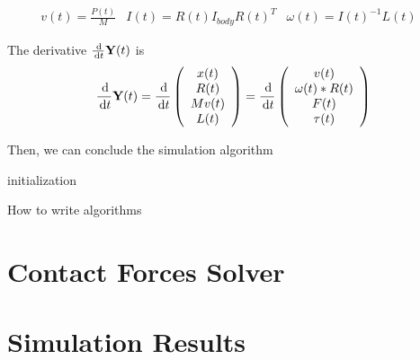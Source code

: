 \begin{align*}
    v(t) = \frac{P(t)}{M} & 
    I(t) = R(t)I_{body}R(t)^{T} &
    \omega(t) = I(t)^{-1}L(t) &
\end{align*}

The derivative $\frac{\,\mathrm{d}}{\,\mathrm{d} t}\textbf{Y}(t)$ is
\begin{equation}
    \frac{\,\mathrm{d}}{\,\mathrm{d}{t}}\textbf{Y}(t) = \frac{\,\mathrm{d}}{\,\mathrm{d} t}\left(
        \begin{array}{c}
            x(t) \\
            R(t) \\
            M v(t) \\
            L(t) \\
        \end{array}
    \right) = \frac{\,\mathrm{d}}{\,\mathrm{d} t}\left(
        \begin{array}{c}
            v(t) \\
            \omega(t)*R(t) \\
            F(t) \\
            \tau(t) \\
        \end{array}
    \right)
\end{equation}

Then, we can conclude the simulation algorithm

\begin{algorithm}[H]
 initialization\;
 \caption{How to write algorithms}
\end{algorithm}


\section{Contact Forces Solver}

\section{Simulation Results}